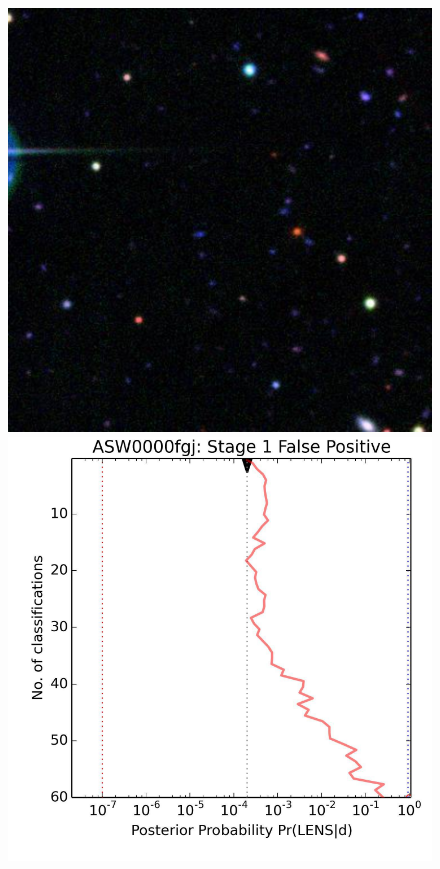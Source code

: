 \documentclass[useAMS,usenatbib,a4paper]{mn2e}
\begin{document}
\begin{figure}
\begin{minipage}{\linewidth}
  \begin{minipage}[t]{0.47\linewidth}
    \begin{minipage}{0.46\linewidth}
      \centering\includegraphics[width=\linewidth]{ASW0000fgj_gri.pdf}
    \end{minipage}\hfill
    \begin{minipage}{0.50\linewidth}
      \centering\includegraphics[width=\linewidth]{ASW0000fgj_stage1_trajectory.pdf}

\end{minipage}
\end{minipage}
\end{minipage}
\end{figure}
\end{document}
